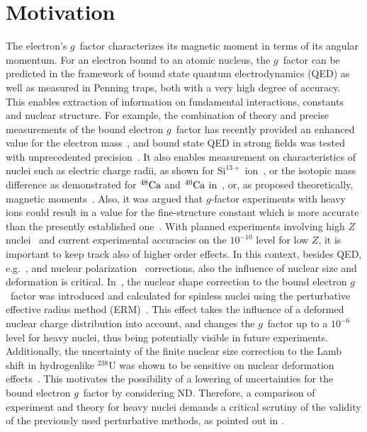 \section{Motivation}
The electron's $g$~factor characterizes its magnetic moment in terms of its angular momentum. For an electron bound to an atomic nucleus, the $g$~factor can be predicted in the framework of bound state quantum electrodynamics (QED) as well as measured in Penning traps, both with a very high degree of accuracy. This enables extraction of information on fundamental interactions, constants and nuclear structure. For example, the combination of theory and precise measurements of the bound electron $g$~factor has recently provided an enhanced value for the electron mass~\cite{Sturm2014}, and bound state QED in strong fields was tested with unprecedented precision~\cite{Haffner2000, Verdu2004, Kohler2015, Zatorski2017}. It also enables measurement on characteristics of nuclei such as electric charge radii, as shown for $\textrm{Si}^{13+}$ ion~\cite{Sturm2011}, or the isotopic mass difference as demonstrated for $\null^{48} \textrm{Ca}$ and $\null^{40} \textrm{Ca}$ in~\cite{Kohler2016}, or, as proposed theoretically, magnetic moments~\cite{Yerokhin2011}.  Also, it was argued that $g$-factor experiments with heavy ions could result in a value for the fine-structure constant which is more accurate than the presently established one~\cite{Shabaev2006}.
With planned experiments involving high $Z$ nuclei~\cite{HITRAP2008,vogel2015} and current experimental accuracies on the $10^{-10}$ level for low $Z$, it is important to keep track also of higher order effects. In this context, besides QED, e.g.~\cite{Yerokhin2004,yerokhin2017,Pachucki2005, czarnecki2016,czarnecki2018}, and nuclear polarization~\cite{Nefiodov} corrections, also the influence of nuclear size and deformation is critical.
In~\cite{jacek2012}, the nuclear shape correction to the bound electron $g$~factor was introduced and calculated for spinless nuclei using the perturbative effective radius method (ERM)~\cite{Shabaev1993,kozhedub2008}. This effect takes the influence of a deformed nuclear charge distribution into account, and changes the $g$~factor up to a $10^{-6}$ level for heavy nuclei, thus being potentially visible in future experiments.
Additionally, the uncertainty of the finite nuclear size correction to the Lamb shift in hydrogenlike $^{238}$U was shown to be sensitive on nuclear deformation effects~\cite{kozhedub2008}.
This motivates the possibility of a lowering of uncertainties for the bound electron $g$~factor by considering ND.
Therefore, a comparison of experiment and theory for heavy nuclei demands a critical scrutiny of the validity of the previously used perturbative methods, as pointed out in \cite{karshenboim2018}.

